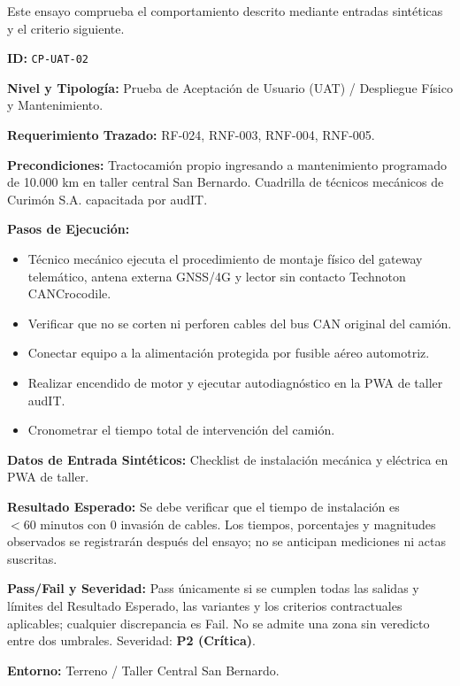 Este ensayo comprueba el comportamiento descrito mediante entradas sintéticas y el criterio siguiente.

\par\noindent\textbf{ID:} \texttt{CP-\allowbreak{}UAT-\allowbreak{}02}\par
\par\noindent\textbf{Nivel y Tipología:} Prueba de Aceptación de Usuario (UAT) / Despliegue Físico y Mantenimiento.\par
\par\noindent\textbf{Requerimiento Trazado:} RF-024, RNF-003, RNF-004, RNF-005.\par
\par\noindent\textbf{Precondiciones:} Tractocamión propio ingresando a mantenimiento programado de 10.000 km en taller central San Bernardo. Cuadrilla de técnicos mecánicos de Curimón S.A. capacitada por audIT.\par
\par\noindent\textbf{Pasos de Ejecución:}\par
\begin{itemize}
\item Técnico mecánico ejecuta el procedimiento de montaje físico del gateway telemático, antena externa GNSS/4G y lector sin contacto Technoton CANCrocodile.
\item Verificar que no se corten ni perforen cables del bus CAN original del camión.
\item Conectar equipo a la alimentación protegida por fusible aéreo automotriz.
\item Realizar encendido de motor y ejecutar autodiagnóstico en la PWA de taller audIT.
\item Cronometrar el tiempo total de intervención del camión.
\end{itemize}

\par\noindent\textbf{Datos de Entrada Sintéticos:} Checklist de instalación mecánica y eléctrica en PWA de taller.\par
\par\noindent\textbf{Resultado Esperado:} Se debe verificar que el tiempo de instalación es \(< 60\text{ minutos}\) con 0 invasión de cables. Los tiempos, porcentajes y magnitudes observados se registrarán después del ensayo; no se anticipan mediciones ni actas suscritas.\par
\par\noindent\textbf{Pass/Fail y Severidad:} Pass únicamente si se cumplen todas las salidas y límites del Resultado Esperado, las variantes y los criterios contractuales aplicables; cualquier discrepancia es Fail. No se admite una zona sin veredicto entre dos umbrales. Severidad: \textbf{P2 (Crítica)}.\par
\par\noindent\textbf{Entorno:} Terreno / Taller Central San Bernardo.\par

